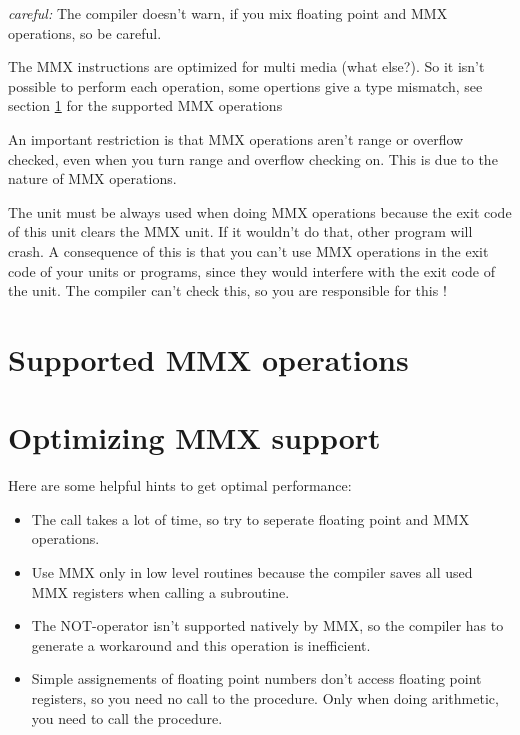 \documentclass{report}
\begin{document}
{\em careful:} The compiler doesn't warn, if you mix floating point and 
MMX operations, so be careful.

The MMX instructions are optimized for multi media (what else?).
So it isn't possible to perform each operation, some opertions
give a type mismatch, see section \ref {se:SupportedMMX} for the supported
MMX operations

An important restriction is that MMX operations aren't range or overflow 
checked, even when you turn range and overflow checking on. This is due to
the nature of MMX operations. 

The  unit must be always used when doing MMX operations
because the exit code of this unit clears the MMX unit. If it wouldn't do
that, other program will crash. A consequence of this is that you can't use 
MMX operations in the exit code of your units or programs, since they would
interfere  with the exit code of the  unit. The compiler can't
check this, so you are responsible for this ! 

\section{Supported MMX operations}
\label{se:SupportedMMX}



\section{Optimizing MMX support}
\label{se:OptimizingMMX}
Here are some helpful hints to get optimal performance:
\begin{itemize}
\item The  call takes a lot of time, so try to seperate floating 
point and MMX operations.
\item Use MMX only in low level routines because the compiler
  saves all used MMX registers when calling a subroutine.
\item The NOT-operator isn't supported natively by MMX, so the
  compiler has to generate a workaround and this operation
  is inefficient.
\item Simple assignements of floating point numbers don't access
  floating point registers, so you need no call to the 
  procedure. Only when doing arithmetic, you need to call the 
procedure.
\end{itemize}


\end{document}
